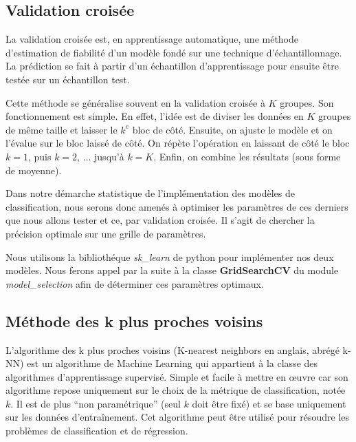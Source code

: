 \documentclass[11pt]{article}
\begin{document}
\begin{center}
\subsection{Validation croisée}

La validation croisée est, en apprentissage automatique, une méthode d’estimation de fiabilité d’un modèle fondé sur une technique d’échantillonnage.\cite{v} La prédiction se fait à partir d’un échantillon d’apprentissage pour ensuite être testée sur un échantillon test.\par

Cette méthode se généralise souvent en la validation croisée à $K$ groupes. Son fonctionnement est simple.
En effet, l’idée est de diviser les données en $K$ groupes de même taille et laisser le $k^{e}$ bloc de côté. Ensuite, on ajuste le modèle et on l’évalue sur le bloc laissé de côté. On répète l’opération en laissant de côté le bloc $k=1$, puis $k=2,\, \dots$ jusqu’à $k=K$. Enfin, on combine les résultats (sous forme de moyenne).\cite{K-cv}\par

Dans notre démarche statistique de l'implémentation des modèles de classification, nous serons donc amenés à optimiser les paramètres de ces derniers que nous allons tester et ce, par validation croisée. Il s'agit de chercher la précision optimale sur une grille de paramètres.\par

Nous utilisons la bibliothéque \textit{sk\_learn} de python pour implémenter nos deux modèles. Nous ferons appel par la suite à la classe \textbf{GridSearchCV} du module \textit{model\_selection} afin de déterminer ces paramètres optimaux.

\subsection{Méthode des k plus proches voisins}

L’algorithme des k plus proches voisins (K-nearest neighbors en anglais, abrégé k-NN) est un algorithme de Machine Learning qui appartient à la classe des algorithmes d’apprentissage supervisé.
Simple et facile à mettre en œuvre car son algorithme repose uniquement sur le choix de la métrique de classification, notée $k$. Il est de plus “non paramétrique” (seul $k$ doit être fixé) et se base uniquement sur les données d’entraînement.{\cite{k-nn}}
Cet algorithme peut être utilisé pour résoudre les problèmes de classification et de régression.{\cite{3}}\par


\end{center}
\end{document}

